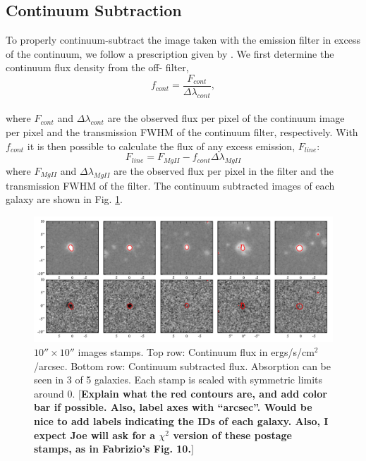 \documentclass[twocolumn]{aastex6}
\begin{document}
\subsection{Continuum Subtraction}\label{subsec.cont_sub}
To properly continuum-subtract the image taken with the emission filter in excess of the continuum, we follow a prescription given by \cite{Battaia_2015}. 
We first determine the continuum flux density from the off- filter,
\begin{equation}
f_{cont}=\frac{F_{cont}}{\Delta \lambda_{cont}},
\end{equation}\\
where $F_{cont}$ and $\Delta \lambda_{cont}$ are the observed flux per pixel of the continuum image per pixel and the transmission FWHM of the continuum filter, respectively. With $f_{cont}$ it is then possible to calculate the flux of any excess emission, $F_{line}$:
\begin{equation}
F_{line}=F_{MgII}-f_{cont} \Delta \lambda_{MgII}
\label{eq:subtraction}
\end{equation}
where $F_{MgII}$ and $\Delta \lambda_{MgII}$ are the observed flux per pixel in the  filter and the transmission FWHM of the  filter. The continuum subtracted images of each galaxy are shown in Fig. \ref{fig:stamp_images}.

\begin{figure}[!htb]
\centering
\includegraphics[scale=0.7]{../Figures/stamps.pdf}
\caption{ $10'' \times 10''$ images stamps. Top row: Continuum flux in ergs/s/cm$^2$/arcsec. Bottom row: Continuum subtracted  flux.  Absorption can be seen in 3 of 5 galaxies. Each stamp is scaled with symmetric limits around 0.
[{\bf Explain what the red contours are, and add color bar if possible.  Also, label axes with ``arcsec''.  Would be nice to add labels indicating the IDs of each galaxy.  Also, I expect Joe will ask for a $\chi^2$ version of these postage stamps, as in Fabrizio's Fig. 10.}]
}
\label{fig:stamp_images}
\end{figure}
\end{document}
